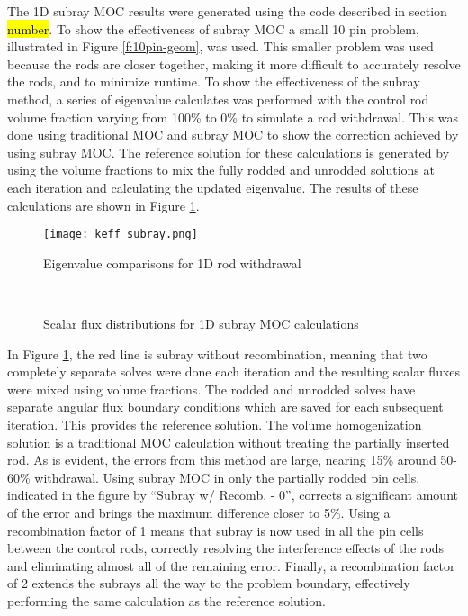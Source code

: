 The 1D subray MOC results were generated using the code described in section \hl{number}.  To show the effectiveness of subray MOC a small 10 pin problem, illustrated in Figure \ref{f:10pin-geom}, was used.  This smaller problem was used because the rods are closer together, making it more difficult to accurately resolve the rods, and to minimize runtime.  To show the effectiveness of the subray method, a series of eigenvalue calculates was performed with the control rod volume fraction varying from 100\% to 0\% to simulate a rod withdrawal.  This was done using traditional MOC and subray MOC to show the correction achieved by using subray MOC.  The reference solution for these calculations is generated by using the volume fractions to mix the fully rodded and unrodded solutions at each iteration and calculating the updated eigenvalue.  The results of these calculations are shown in Figure \ref{f:1d-subray-keff}.

\begin{figure}[h]
    \centering
    \texttt{[image: keff\_subray.png]}
    \caption{Eigenvalue comparisons for 1D rod withdrawal}\label{f:1d-subray-keff}
\end{figure}

\begin{figure}[!htb]
    \centering
    ~
    \caption{Scalar flux distributions for 1D subray MOC calculations}\label{f:1d-subray-scalflux}
\end{figure}

In Figure \ref{f:1d-subray-keff}, the red line is subray without recombination, meaning that two completely separate solves were done each iteration and the resulting scalar fluxes were mixed using volume fractions.  The rodded and unrodded solves have separate angular flux boundary conditions which are saved for each subsequent iteration.  This provides the reference solution.  The volume homogenization solution is a traditional MOC calculation without treating the partially inserted rod.  As is evident, the errors from this method are large, nearing 15\% around 50-60\% withdrawal.  Using subray MOC in only the partially rodded pin cells, indicated in the figure by ``Subray w/ Recomb. - 0'', corrects a significant amount of the error and brings the maximum difference closer to 5\%.  Using a recombination factor of 1 means that subray is now used in all the pin cells between the control rods, correctly resolving the interference effects of the rods and eliminating almost all of the remaining error.  Finally, a recombination factor of 2 extends the subrays all the way to the problem boundary, effectively performing the same calculation as the reference solution.


